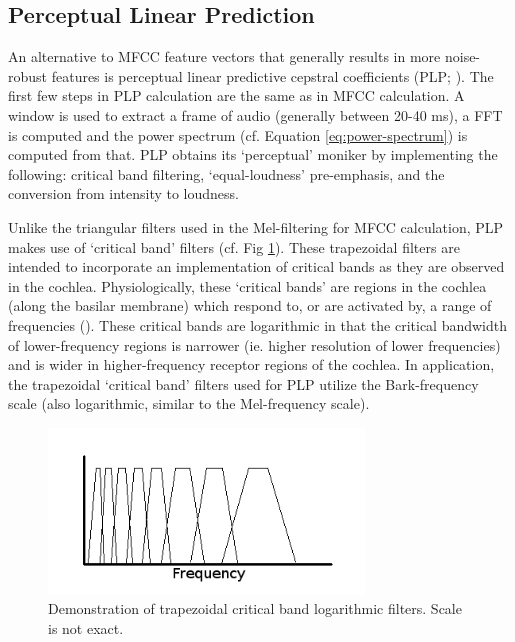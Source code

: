 \DIFdelbegin \subsubsection{}%
\addtocounter{subsubsection}{-1}%
\DIFdelend \DIFaddbegin \subsection{Perceptual Linear Prediction}\DIFaddend \label{sec:plp}

An alternative to MFCC feature vectors that generally results in more noise-robust features is perceptual linear predictive cepstral coefficients (PLP; \cite{hermansky:85}).  The first few steps in PLP calculation are the same as in MFCC calculation.  A window is used to extract a frame of audio (generally between 20-40 ms), a FFT is computed and the power spectrum (cf. Equation \ref{eq:power-spectrum}) is computed from that.  PLP obtains its `perceptual' moniker by implementing the following: critical band filtering, `equal-loudness' pre-emphasis, and the conversion from intensity to loudness.  

Unlike the triangular filters used in the Mel-filtering for MFCC calculation, PLP makes use of `critical band' filters (cf. Fig \ref{fig:filt-cb}).  These trapezoidal filters are intended to incorporate an implementation of critical bands as they are observed in the cochlea. Physiologically, these `critical bands' are regions in the cochlea (along the basilar membrane) which respond to, or are activated by, a range of frequencies (\cite{fletcher:40}).  These critical bands are logarithmic in that the critical bandwidth of lower-frequency regions is narrower (ie. higher resolution of lower frequencies) and is wider in higher-frequency receptor regions of the cochlea.  In application, the trapezoidal `critical band' filters used for PLP utilize the Bark-frequency scale (also logarithmic, similar to the Mel-frequency scale).

\begin{figure}[h]
\centering
\includegraphics[width=0.75\textwidth]{figure/filt-cb.png}
\caption{Demonstration of trapezoidal critical band logarithmic filters. Scale is not exact.}\label{fig:filt-cb}
\end{figure}

